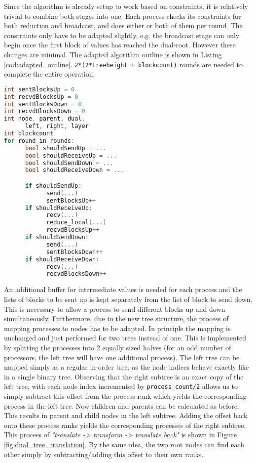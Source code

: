\documentclass[twoside,twocolumn,hidelinks]{article}
\begin{document}
Since the algorithm is already setup to work based on constraints, it is relatively trivial to combine both stages into one. Each process checks its constraints for both reduction and broadcast, and does either or both of them per round. The constraints only have to be adapted slightly, e.g. the broadcast stage can only begin once the first block of values has reached the dual-root. However these changes are minimal. The adapted algorithm outline is shown in Listing \ref{cod:adapted_outline}. \texttt{2*(2*treeheight + blockcount)} rounds are needed to complete the entire operation.

\begin{lstlisting}[label=cod:adapted_outline,language=C++,caption=Constraint based implementation,captionpos=b]
int sentBlocksUp = 0
int recvdBlocksUp = 0
int sentBlocksDown = 0
int recvdBlocksDown = 0
int node, parent, dual,
      left, right, layer
int blockcount
for round in rounds:
      bool shouldSendUp = ...
      bool shouldReceiveUp = ...
      bool shouldSendDown = ...
      bool shouldReceiveDown = ...

      if shouldSendUp: 
            send(...)
            sentBlocksUp++
      if shouldReceiveUp: 
            recv(...)
            reduce_local(...)
            recvdBlocksUp++
      if shouldSendDown: 
            send(...)
            sentBlocksDown++
      if shouldReceiveDown: 
            recv(...)
            recvdBlocksDown++

\end{lstlisting}

An additional buffer for intermediate values is needed for each process and the lists of blocks to be sent up is kept separately from the list of block to send down. This is necessary to allow a process to send different blocks up and down simultaneously. Furthermore, due to the new tree structure, the process of mapping processes to nodes has to be adapted. In principle the mapping is unchanged and just performed for two trees instead of one. This is implemented by splitting the processes into 2 equally sized halves (for an odd number of processors, the left tree will have one additional process). The left tree can be mapped simply as a regular in-order tree, as the node indices behave exactly like in a single binary tree. Observing that the right subtree is an exact copy of the left tree, with each node index incremented by \texttt{process\_count/2} allows us to simply subtract this offset from the process rank which yields the corresponding process in the left tree. Now children and parents can be calculated as before. This results in parent and child nodes in the left subtree. Adding the offset back onto these process ranks yields the corresponding processes of the right subtree. This process of \textit{"translate -> transform -> translate back"} is shown in Figure \ref{fig:dual_tree_translation}. By the same idea, the two root nodes can find each other simply by subtracting/adding this offset to their own ranks.
\end{document}
